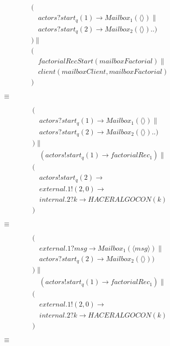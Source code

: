 \documentclass[fleqn]{article}
\newcommand{\myList}[1]{\langle #1 \rangle}
\begin{document}
\begin{gather*}
( \\ 
\quad actors?start_q(1) \rightarrow Mailbox_1(\myList{}) \parallel \\
\quad actors?start_q(2) \rightarrow Mailbox_2(\myList{}) .. )  \\
) \parallel \\
( \\
\quad factorialRecStart(mailboxFactorial) \parallel \\
\quad client(mailboxClient, mailboxFactorial) \\ 
)
\end{gather*}

$\qquad \qquad \equiv$

\begin{gather*}
( \\ 
\quad actors?start_q(1) \rightarrow Mailbox_1(\myList{}) \parallel \\
\quad actors?start_q(2) \rightarrow Mailbox_2(\myList{}) .. )  \\
) \parallel \\
\quad ( actors!start_q(1) \rightarrow factorialRec_1 ) \parallel \\
( \\
\quad actors!start_q(2) \rightarrow  \\
\quad external.1!(2,0) \rightarrow \\
\quad internal.2?k \rightarrow HACERALGOCON(k) \\ 
)
\end{gather*}


$\qquad \qquad \equiv$

\begin{gather*}
( \\ 
\quad external.1?msg \rightarrow Mailbox_1(\myList{msg})  \parallel \\
\quad actors?start_q(2) \rightarrow Mailbox_2(\myList{}) )  \\
) \parallel \\
\quad ( actors!start_q(1) \rightarrow factorialRec_1 ) \parallel \\
( \\
\quad external.1!(2,0) \rightarrow \\
\quad internal.2?k \rightarrow HACERALGOCON(k) \\ 
)
\end{gather*}

$\qquad \qquad \equiv$
\end{document}
